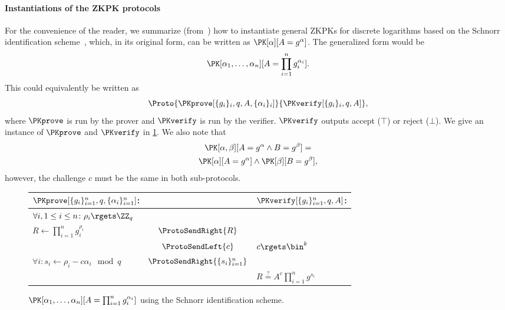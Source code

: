 \paragraph*{Instantiations of the \acs{ZKPK} protocols}

For the convenience of the reader, we summarize 
(from~\cite{Camenisch-phdthesis}) how to instantiate general \acp{ZKPK} for 
discrete logarithms based on the Schnorr identification scheme~\cite{Schnorr}, 
which, in its original form, can be written as \(\PK[\alpha][A = g^\alpha]\).
The generalized form would be \[
  \PK[\alpha_1, \dotsc, \alpha_n][A = \prod_{i=1}^n g_i^{\alpha_i}].
\]
This could equivalently be written as
\begin{equation*}
  \Proto%
  {\PKprove[\{g_i\}_i, q, A, \{\alpha_i\}_i]}%
  {\PKverify[\{g_i\}_i, q, A]},
\end{equation*}
where \(\PKprove\) is run by the prover and \(\PKverify\) is run by the 
verifier.
\(\PKverify\) outputs accept (\(\top\)) or reject (\(\bot\)).
We give an instance of \(\PKprove\) and \(\PKverify\) in \cref{PKalgorithms}.
We also note that
\begin{multline*}
  \PK[\alpha, \beta][A = g^\alpha \land B = g^\beta] = \\
  \PK[\alpha][A = g^\alpha] \land \PK[\beta][B = g^\beta],
\end{multline*}
however, the challenge \(c\) must be the same in both sub-protocols.

\begin{figure*}
  \small
  \begin{tabular}{lcl}
    \(\PKprove[\{g_i\}_{i=1}^n, q, \{\alpha_i\}_{i=1}^n]\):
    &
    & \(\PKverify[\{g_i\}_{i=1}^n, q, A]\):
    \\
    \midrule

    \(\forall i, 1\leq i\leq n\colon \rho_i\rgets \ZZ_q\)
    &
    &
    \\

    \(R\gets \prod_{i=1}^n g_i^{\rho_i}\)
    & \(\ProtoSendRight{R}\)
    &
    \\

    & \(\ProtoSendLeft{c}\)
    & \(c\rgets \bin^k\)
    \\

    \(\forall i\colon s_i\gets \rho_i - c\alpha_i \mod q\)
    & \(\ProtoSendRight{\{s_i\}_{i=1}^n}\)
    &
    \\

    &
    & \(R \stackrel{?}{=} A^c \prod_{i=1}^n g^{s_i}\)
    \\
    
  \end{tabular}
  \caption{%
    \(\PK[\alpha_1, \dotsc, \alpha_n][A = \prod_{i=1}^n g_i^{\alpha_i}]\) using 
    the Schnorr identification scheme.
  }%
  \label{PKalgorithms}
\end{figure*}

